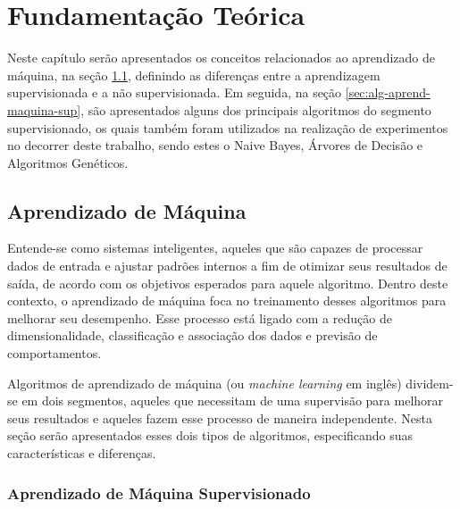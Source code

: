 \documentclass[oneside,openright,12pt]{ufsm_2015} %
\begin{document}

\chapter{Fundamentação Teórica}
\label{sec:fund-teorica}

\par Neste capítulo serão apresentados os conceitos relacionados ao aprendizado de máquina, na seção \ref{sec:aprend-maquina}, definindo as diferenças entre a aprendizagem supervisionada e a não supervisionada. Em seguida, na seção \ref{sec:alg-aprend-maquina-sup}, são apresentados alguns dos principais algoritmos do segmento supervisionado, os quais também foram utilizados na realização de experimentos no decorrer deste trabalho, sendo estes o Naive Bayes, Árvores de Decisão e Algoritmos Genéticos.

\section{Aprendizado de Máquina}
\label{sec:aprend-maquina}

\par Entende-se como sistemas inteligentes, aqueles que são capazes de processar dados de entrada e ajustar padrões internos a fim de otimizar seus resultados de saída, de acordo com os objetivos esperados para aquele algoritmo. Dentro deste contexto, o aprendizado de máquina foca no treinamento desses algoritmos para melhorar seu desempenho. Esse processo está ligado com a redução de dimensionalidade, classificação e associação dos dados e previsão de comportamentos.

\par Algoritmos de aprendizado de máquina (ou \textit{machine learning} em inglês) dividem-se em dois segmentos, aqueles que necessitam de uma supervisão para melhorar seus resultados e aqueles fazem esse processo de maneira independente. Nesta seção serão apresentados esses dois tipos de algoritmos, especificando suas características e diferenças.

\subsection{Aprendizado de Máquina Supervisionado}
\label{sec:aprend-maquina-sup}
\end{document}
